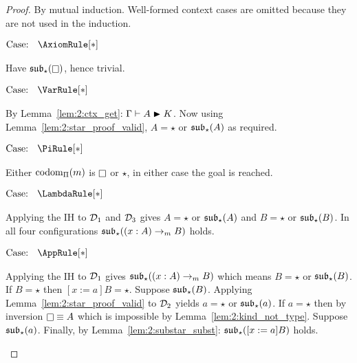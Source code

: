 \begin{proof}
    By mutual induction.
    Well-formed context cases are omitted because they are not used in the induction.

    $\text{Case: }\begin{array}{c} \AxiomRule[*] \end{array}$
    \begin{proofcase}
        Have $\substar(\kind)$, hence trivial.
    \end{proofcase}

    $\text{Case: }\begin{array}{c} \VarRule[*] \end{array}$
    \begin{proofcase}
        By Lemma~\ref{lem:2:ctx_get}: $\Gamma \vdash A \blacktriangleright K$.
        Now using Lemma~\ref{lem:2:star_proof_valid}, $A = \star$ or $\mathfrak{sub}_\star(A)$ as required.
    \end{proofcase}

    $\text{Case: }\begin{array}{c} \PiRule[*] \end{array}$
    \begin{proofcase}
        Either $\mbox{\normalfont codom}_\Pi(m)$ is $\kind$ or $\star$, in either case the goal is reached.
    \end{proofcase}

    $\text{Case: }\begin{array}{c} \LambdaRule[*] \end{array}$
    \begin{proofcase}
        Applying the IH to $\mathcal{D}_{1}$ and $\mathcal{D}_{3}$ gives $A = \star$ or $\mathfrak{sub}_\star(A)$ and $B = \star$ or $\mathfrak{sub}_\star(B)$.
        In all four configurations $\mathfrak{sub}_\star((x : A) \to_m B)$ holds.
    \end{proofcase}

    $\text{Case: }\begin{array}{c} \AppRule[*] \end{array}$
    \begin{proofcase}
        Applying the IH to $\mathcal{D}_{1}$ gives $\mathfrak{sub}_\star((x : A) \to_m B)$ which means $B = \star$ or $\mathfrak{sub}_\star(B)$.
        If $B = \star$ then $[x := a]B = \star$.
        Suppose $\mathfrak{sub}_\star(B)$.
        Applying Lemma~\ref{lem:2:star_proof_valid} to $\mathcal{D}_{2}$ yields $a = \star$ or $\mathfrak{sub}_\star(a)$.
        If $a = \star$ then by inversion $\kind \equiv A$ which is impossible by Lemma~\ref{lem:2:kind_not_type}.
        Suppose $\mathfrak{sub}_\star(a)$.
        Finally, by Lemma~\ref{lem:2:substar_subst}: $\mathfrak{sub}_\star([x := a]B)$ holds.
    \end{proofcase}


\end{proof}
